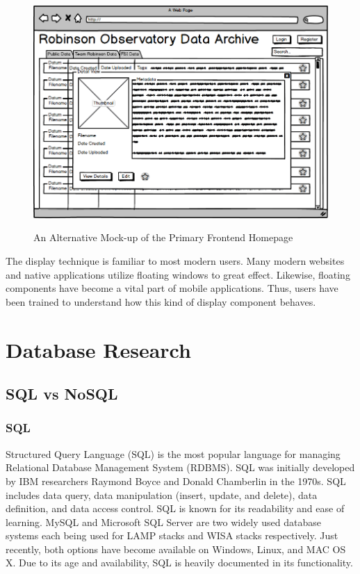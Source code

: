 \documentclass[12pt]{report}
\begin{document}
\begin{figure}[h]
	\centering
	\caption{An Alternative Mock-up of the Primary Frontend Homepage}
	\includegraphics[width=\linewidth]{frontend_floating}
	\label{fig:frontendfloating}
\end{figure}

The display technique is familiar to most modern users. Many modern websites and native applications utilize floating windows to great effect. Likewise, floating components have become a vital part of mobile applications. Thus, users have been trained to understand how this kind of display component behaves.

\section*{Database Research}

\subsection*{SQL vs NoSQL}

\subsubsection*{SQL}

Structured Query Language (SQL) is the most popular language for managing Relational Database Management System (RDBMS).  SQL was initially developed by IBM researchers Raymond Boyce and Donald Chamberlin in the 1970s.  SQL includes data query, data manipulation (insert, update, and delete), data definition, and data access control.  SQL is known for its readability and ease of learning.  MySQL and Microsoft SQL Server are two widely used database systems each being used for LAMP stacks and WISA stacks respectively.  Just recently, both options have become available on Windows, Linux, and MAC OS X.  Due to its age and availability, SQL is heavily documented in its functionality.
\end{document}

